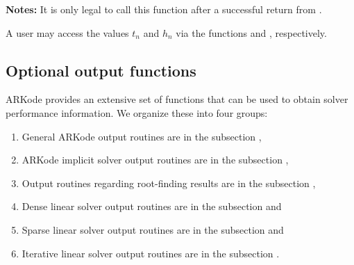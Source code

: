 \documentclass[letterpaper,10pt,english]{sphinxmanual}
\begin{document}
\begin{fulllineitems}
\begin{description}
\begin{itemize}
\end{itemize}

\end{description}

\textbf{Notes:} It is only legal to call this function after a successful
return from {\hyperref[c_interface/User_callable:c.ARKode]{\emph{}}}.

A user may access the values \(t_n\) and \(h_n\) via the
functions {\hyperref[c_interface/User_callable:c.ARKodeGetCurrentTime]{\emph{}}} and
{\hyperref[c_interface/User_callable:c.ARKodeGetLastStep]{\emph{}}}, respectively.

\end{fulllineitems}



\subsection{Optional output functions}
\label{c_interface/User_callable:optional-output-functions}\label{c_interface/User_callable:cinterface-optionaloutputs}
ARKode provides an extensive set of functions that can be used to
obtain solver performance information.  We organize these into four
groups:
\begin{enumerate}
\item {} 
General ARKode output routines are in the subsection
{\hyperref[c_interface/User_callable:cinterface-arkodemainoutputs]{\emph{}}},

\item {} 
ARKode implicit solver output routines are in the subsection
{\hyperref[c_interface/User_callable:cinterface-arkodeimplicitsolveroutputs]{\emph{}}},

\item {} 
Output routines regarding root-finding results are in the subsection
{\hyperref[c_interface/User_callable:cinterface-arkoderootoutputs]{\emph{}}},

\item {} 
Dense linear solver output routines are in the subsection
{\hyperref[c_interface/User_callable:cinterface-arkdlsoutputs]{\emph{}}} and

\item {} 
Sparse linear solver output routines are in the subsection
{\hyperref[c_interface/User_callable:cinterface-arkslsoutputs]{\emph{}}} and

\item {} 
Iterative linear solver output routines are in the subsection
{\hyperref[c_interface/User_callable:cinterface-arkspilsoutputs]{\emph{}}}.

\end{enumerate}
\end{document}
